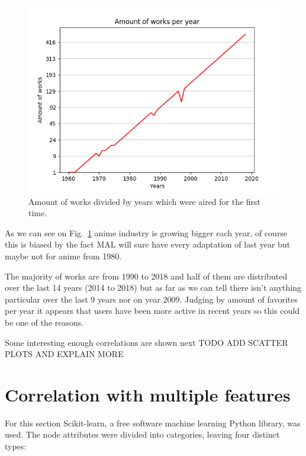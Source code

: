 \begin{figure}[!hbt]
	\begin{center}
	\includegraphics[width=\columnwidth]{graphics/worksPerYear_1960-2018.png}
	\caption{Amount of works divided by years which were aired for the first time.}
	\label{fig:amountOfWorksPerYear}
	\end{center}
\end{figure}
As we can see on Fig.~\ref{fig:amountOfWorksPerYear} anime industry is growing bigger each year, of course this is biased by the fact MAL will sure have every adaptation of last year but maybe not for anime from 1980.

The majority of works are from 1990 to 2018 and half of them are distributed over the last 14 years (2014 to 2018) but as far as we can tell there isn’t anything particular over the last 9 years nor on year 2009. Judging by amount of favorites per year it appears that users have been more active in recent years so this could be one of the reasons.

Some interesting enough correlations are shown next
TODO ADD SCATTER PLOTS AND EXPLAIN MORE

\section{Correlation with multiple features}
For this section Scikit-learn, a free software machine learning Python library, was used. The node attributes were divided into categories, leaving four distinct types:

